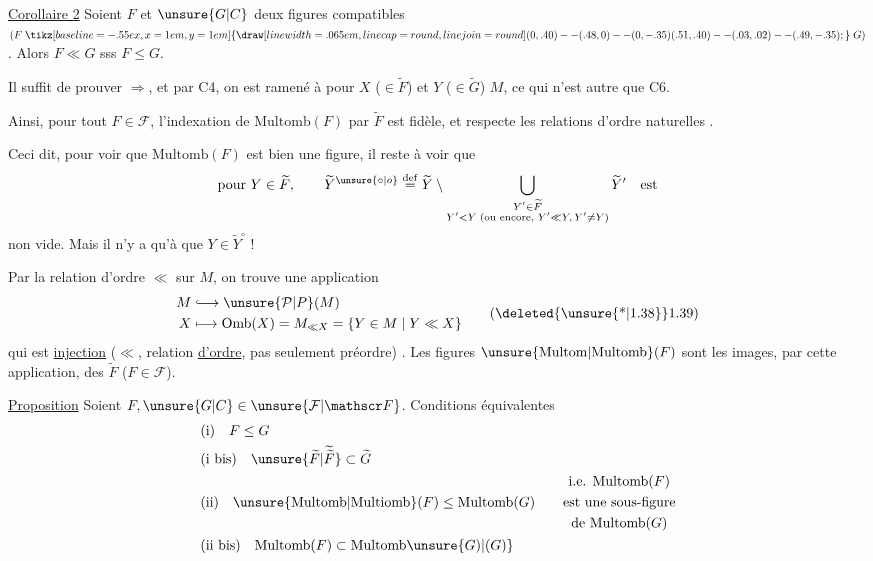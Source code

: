 \uline{Corollaire 2} Soient $F$ et $\unsure{G|C}$ deux figures compatibles $(F \mathrel{\tikz[baseline=-.55ex,x=1em,y=1em]{\draw[line width=.065em,line cap=round,line join=round] (0,.40)--(.48,0)--(0,-.35) (.51,.40)--(.03,.02)--(.49,-.35);}} G)$. Alors $F\ll G$ sss $F\leq G$.

Il suffit de prouver $\Longrightarrow$, et par C4, on est ramené à  pour $X$ ($\in\widetilde F$) et $Y$ ($\in\widetilde G$)  $M$, ce qui n'est autre que C6.

Ainsi, pour tout $F\in\mathcal{F}$, l'indexation de $\mathrm{Multomb}(F)$ par $\widetilde F$ est fidèle, et respecte les relations d'ordre naturelles .

Ceci  dit, pour voir que $\mathrm{Multomb}(F)$ est bien une figure, il reste à voir que
\[
 \text{pour }Y\in\widetilde F,\qquad \widetilde Y^{\unsure{\circ|o}}\overset{\mathrm{def}}{=}
 \widetilde Y\setminus
 \bigcup_{\substack{Y'\in\widetilde F\\Y'<Y\;(\text{ou encore, }Y'\ll Y,\,Y'\ne Y)}}\widetilde Y'\quad\text{est}
\]
non vide. Mais il n'y a qu'à  que $Y\in\widetilde Y^\circ$ !

Par la relation d'ordre $\ll$ sur $M$, on trouve une application
\[
 \begin{aligned}
 M&\lhook\joinrel\longrightarrow\unsure{\mathcal{P}|P}(M)\\
 X&\longmapsto\mathrm{Omb}(X)=M_{\ll X}=\{Y\in M\mid Y\ll X\}
 \end{aligned}
 \tag*{(\deleted{\unsure{*|1.38}}1.39)}
\]
qui est \uline{injection} ($\ll$, relation \uline{d'ordre}, pas seulement préordre) . Les figures $\unsure{\mathrm{Multom}|\mathrm{Multomb}}(F)$ sont les images, par cette application, des $\widetilde F$ ($F\in\mathcal{F}$). 

\uline{Proposition} Soient $F,\unsure{G|C}\in\unsure{\mathcal F|\mathscr F}$. Conditions équivalentes
\[
\begin{aligned}
&\text{(i)}\quad F\leq G\\
&\text{(i bis)}\quad \unsure{\widetilde F|\widetilde{\widetilde F}}\subset\widetilde G\\
&\text{(ii)}\quad \unsure{\mathrm{Multomb}|\mathrm{Multiomb}}(F)\leq\mathrm{Multomb}(G)
 \qquad\begin{gathered}\text{i.e. }\mathrm{Multomb}(F)\\\text{est une sous-figure}\\\text{de }\mathrm{Multomb}(G)\end{gathered}\\
&\text{(ii bis)}\quad \mathrm{Multomb}(F)\subset\mathrm{Multomb}\unsure{G)|(G)}
\end{aligned}
\]

